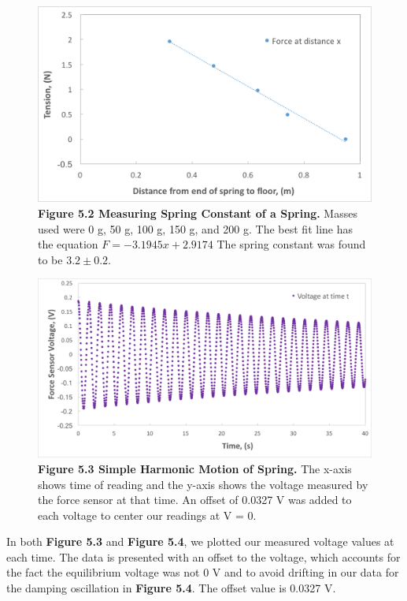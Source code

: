 \documentclass[11pt]{report}
\begin{document}
\begin{figure}
    \includegraphics[width=\linewidth]{ForceDistance.png}
    \captionsetup{labelformat=empty}
    \caption{\textbf{Figure 5.2 Measuring Spring Constant of a Spring.}  Masses
    used were 0 g, 50 g, 100 g, 150 g, and 200 g.  The best fit line has the
equation \(F = -3.1945x + 2.9174\) The spring constant was found to be \(3.2 \pm
0.2\).}
\end{figure}

\begin{figure}
    \includegraphics[width=\linewidth]{VoltageTime1.png}
    \captionsetup{labelformat=empty}
    \caption{\textbf{Figure 5.3 Simple Harmonic Motion of Spring.} The x-axis
    shows time of reading and the y-axis shows the voltage measured by the force
sensor at that time. An offset of 0.0327 V was added to each voltage to center
our readings at V = 0.}
\end{figure}

In both \textbf{Figure 5.3} and \textbf{Figure 5.4}, we plotted our measured
voltage values at each time. The data is presented with
an offset to the voltage, which accounts for the fact the equilibrium voltage
was not 0 V and to avoid drifting in our data for the damping oscillation in
\textbf{Figure 5.4}.  The offset value is 0.0327 V.
\end{document}
